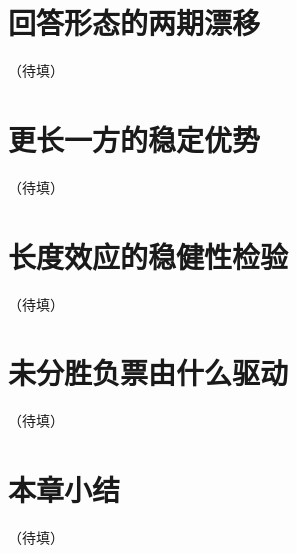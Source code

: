 
\section{回答形态的两期漂移}
（待填）

\section{更长一方的稳定优势}
（待填）

\section{长度效应的稳健性检验}
（待填）

\section{未分胜负票由什么驱动}
（待填）

\section{本章小结}
（待填）
